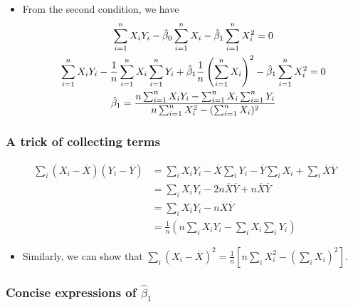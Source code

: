 \documentclass[11pt]{article}
\begin{document}
\begin{itemize}
\item From the second condition, we have
\begin{gather}
\sum_{i=1}^n X_i Y_i - \hat{\beta}_0 \sum_{i=1}^n X_i - \hat{\beta}_1 \sum_{i=1}^n X^2_i = 0  \notag \\
\sum_{i=1}^n X_i Y_i - \frac{1}{n}\sum_{i=1}^n X_i \sum_{i=1}^n Y_i + \hat{\beta}_1 \frac{1}{n} \left(\sum_{i=1}^n X_i\right)^2 - \hat{\beta}_1 \sum_{i=1}^n X_i^2 = 0 \notag \\
\hat{\beta}_1 = \frac{n\sum_{i=1}^n X_i Y_i - \sum_{i=1}^n X_i \sum_{i=1}^n Y_i}{n\sum_{i=1}^n X_i^2 - (\sum_{i=1}^n X_i)^2} \label{eq:bhat-1}
\end{gather}
\end{itemize}

\subsubsection*{A trick of collecting terms}
\label{sec:org6821f0e}

\begin{align*}
\sum_i(X_i - \overline{X})(Y_i - \overline{Y})
&= \sum_i X_iY_i - \overline{X}\sum_iY_i - \overline{Y}\sum_iX_i + \sum_i \overline{X}\overline{Y} \\
&= \sum_i X_iY_i - 2n\overline{X}\overline{Y} + n\overline{X}\overline{Y} \\
&= \sum_i X_iY_i - n\overline{X}\overline{Y} \\
&= \frac{1}{n} \left(n\sum_i X_iY_i - \sum_i X_i \sum_i Y_i\right)
\end{align*}

\begin{itemize}
\item Similarly, we can show that \(\sum_i (X_i - \overline{X})^2 =
  \frac{1}{n} \left[n\sum_i X_i^2 - (\sum_i X_i)^2\right]\).
\end{itemize}

\subsubsection*{Concise expressions of \(\hat{\beta}_1\)}
\label{sec:org49a9049}
\end{document}

